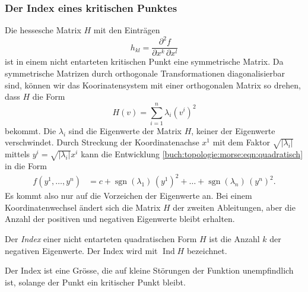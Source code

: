 %
%
\subsubsection{Der Index eines kritischen Punktes}
Die hessesche Matrix $H$ mit den Einträgen
\[
h_{kl} = \frac{\partial^2 f}{\partial x^k\,\partial x^l}
\]
ist in einem nicht entarteten kritischen Punkt eine symmetrische
Matrix.
Da symmetrische Matrizen durch orthogonale Transformationen
diagonalisierbar sind, können wir das Koorinatensystem mit
einer orthogonalen Matrix so drehen, dass $H$ die Form
\[
H(v)
=
\sum_{i=1}^n \lambda_i (v^i)^2
\]
bekommt.
Die $\lambda_i$ sind die Eigenwerte der Matrix $H$, keiner
der Eigenwerte verschwindet.
Durch Streckung der Koordinatenachse $x^1$ mit dem Faktor
$\!\sqrt{|\lambda_i|}$  mittels
$y^i = \!\sqrt{|\lambda_i|}x^i$ kann die Entwicklung
\eqref{buch:topologie:morse:eqn:quadratisch}
in die Form
\begin{align*}
f(y^1,\dots,y^n)
&=
c
+
\operatorname{sgn}(\lambda_1)\,(y^1)^2
+
\dots
+
\operatorname{sgn}(\lambda_n)\,(y^n)^2.
\end{align*}
Es kommt also nur auf die Vorzeichen der Eigenwerte an.
Bei einem Koordinatenwechsel ändert sich die Matrix $H$ der zweiten
Ableitungen, aber die Anzahl der positiven und negativen Eigenwerte
bleibt erhalten.

\begin{definition}[Index]
%
Der \emph{Index} einer nicht entarteten quadratischen Form $H$ ist die
Anzahl $k$ der negativen Eigenwerte.
Der Index wird mit $\operatorname{Ind}H$ bezeichnet.
\end{definition}

Der Index ist eine Grösse, die auf kleine Störungen der Funktion
unempfindlich ist, solange der Punkt ein kritischer Punkt bleibt.

%
%
